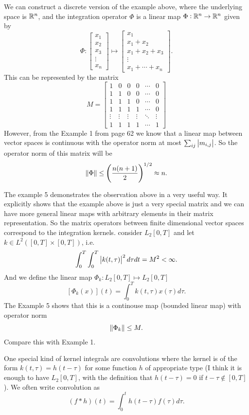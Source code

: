 \begin{observation}
	We can construct a discrete version of the example above, where the underlying space is $ \mathbb{R}^n $, and the integration operator $ \Phi $ is a linear map $ \Phi: \mathbb{R}^n \to \mathbb{R}^n $ given by
	\[ \Phi: \begin{bmatrix}
		x_1 \\ x_2 \\ x_3 \\ \vdots \\ x_n
	\end{bmatrix} \mapsto 
	\begin{bmatrix}
		x_1 \\ x_1+x_2 \\ x_1+x_2+x_3 \\ \vdots \\ x_1+\cdots+x_n
	\end{bmatrix}.
	 \]
	 This can be represented by the matrix
	 \[ M = \begin{bmatrix}
	 	1 & 0 & 0 & 0 & \cdots & 0 \\
	 	1 & 1 & 0 & 0 & \cdots & 0 \\
	 	1 & 1 & 1 & 0 & \cdots & 0 \\
	 	1 & 1 & 1 & 1 & \cdots & 0 \\
	 	\vdots & \vdots & \vdots & \vdots & \ddots & \vdots  \\
	 	1 & 1 & 1 & 1 & \cdots & 1
	 \end{bmatrix} \]
	 However, from the Example 1 from page 62 we know that a linear map between vector spaces is continuous with the operator norm at most $ \sum_{ij} \left|m_{i,j}\right| $. So the operator norm of this matrix will be
	 \[ \norm{\Phi} \leq  \left( \frac{n(n+1)}{2} \right)^{1/2} \approx n. \]
\end{observation}

\begin{summary}
	The example 5 demonstrates the observation above in a very useful way. It explicitly shows that the example above is just a very special matrix and we can have more general linear maps with arbitrary elements in their matrix representation. So the matrix operators between finite dimensional vector spaces correspond to the integration kernels. consider $ L_2[0,T] $ and let $ k \in L^2([0,T]\times [0,T]) $, i.e.
	\[ \int_{0}^{T} \int_{0}^{T} \left|k(t,\tau)\right|^2 d\tau dt = M^2 < \infty. \] 
	And we define the linear map $ \Phi_k: L_2[0,T] \mapsto L_2[0,T] $ 
	\[ [\Phi_k(x)](t) = \int_{0}^{T} k(t,\tau)  x(\tau) d\tau.  \]
	The Example 5 shows that this is a continouse map (bounded linear map) with operator norm 
	\[ \norm{\Phi_k} \leq M. \]
	Compare this with Example 1.
	
	\begin{remark}
		One special kind of kernel integrals are convolutions where the kernel is of the form $ k(t,\tau) = h(t-\tau) $ for some function $ h $ of appropriate type (I think it is enough to have $ L_2[0,T] $, with the definition that $ h(t-\tau) = 0 $ if $ t-\tau \notin [0,T] $). We often write convolution as
		\[ (f\ast h) (t) = \int_{0}^{t} h(t-\tau)f(\tau) d\tau. \]
	\end{remark}
\end{summary}


